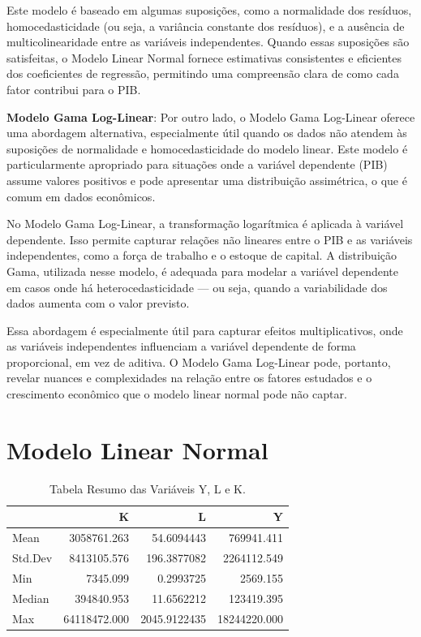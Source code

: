 \documentclass[
  letterpaper,
  DIV=11,
  numbers=noendperiod]{scrreprt}
\begin{document}
Este modelo é baseado em algumas suposições, como a normalidade dos
resíduos, homocedasticidade (ou seja, a variância constante dos
resíduos), e a ausência de multicolinearidade entre as variáveis
independentes. Quando essas suposições são satisfeitas, o Modelo Linear
Normal fornece estimativas consistentes e eficientes dos coeficientes de
regressão, permitindo uma compreensão clara de como cada fator contribui
para o PIB.

\textbf{Modelo Gama Log-Linear}: Por outro lado, o Modelo Gama
Log-Linear oferece uma abordagem alternativa, especialmente útil quando
os dados não atendem às suposições de normalidade e homocedasticidade do
modelo linear. Este modelo é particularmente apropriado para situações
onde a variável dependente (PIB) assume valores positivos e pode
apresentar uma distribuição assimétrica, o que é comum em dados
econômicos.

No Modelo Gama Log-Linear, a transformação logarítmica é aplicada à
variável dependente. Isso permite capturar relações não lineares entre o
PIB e as variáveis independentes, como a força de trabalho e o estoque
de capital. A distribuição Gama, utilizada nesse modelo, é adequada para
modelar a variável dependente em casos onde há heterocedasticidade ---
ou seja, quando a variabilidade dos dados aumenta com o valor previsto.

Essa abordagem é especialmente útil para capturar efeitos
multiplicativos, onde as variáveis independentes influenciam a variável
dependente de forma proporcional, em vez de aditiva. O Modelo Gama
Log-Linear pode, portanto, revelar nuances e complexidades na relação
entre os fatores estudados e o crescimento econômico que o modelo linear
normal pode não captar.

\section{Modelo Linear Normal}\label{modelo-linear-normal}

\begin{longtable}[]{@{}lrrr@{}}

\caption{\label{tbl-t1}Tabela Resumo das Variáveis Y, L e K.}

\tabularnewline

\toprule\noalign{}
& K & L & Y \\
\midrule\noalign{}
\endhead
\bottomrule\noalign{}
\endlastfoot
Mean & 3058761.263 & 54.6094443 & 769941.411 \\
Std.Dev & 8413105.576 & 196.3877082 & 2264112.549 \\
Min & 7345.099 & 0.2993725 & 2569.155 \\
Median & 394840.953 & 11.6562212 & 123419.395 \\
Max & 64118472.000 & 2045.9122435 & 18244220.000 \\

\end{longtable}
\end{document}
